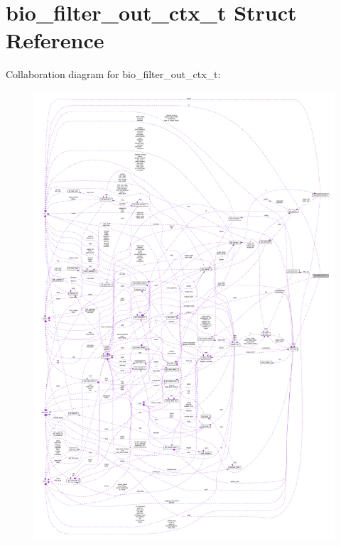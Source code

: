 \hypertarget{structbio__filter__out__ctx__t}{}\section{bio\+\_\+filter\+\_\+out\+\_\+ctx\+\_\+t Struct Reference}
\label{structbio__filter__out__ctx__t}


Collaboration diagram for bio\+\_\+filter\+\_\+out\+\_\+ctx\+\_\+t\+:
\nopagebreak
\begin{figure}[H]
\begin{center}
\leavevmode
\includegraphics[width=350pt]{structbio__filter__out__ctx__t__coll__graph}
\end{center}
\end{figure}
